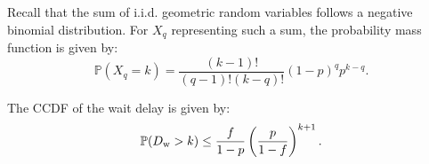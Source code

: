 Recall that the sum of i.i.d. geometric random variables follows a negative binomial distribution\cite{johnson2005univariate}. 
For $X_{q}$ representing such a sum, the probability mass function is given by:
\begin{equation}
    \mathbb{P}(X_{q}=k)=\dfrac{(k-1)!}{(q-1)!(k-q)!}(1-p)^qp^{k-q}.\label{eq:secARQ_geoSum}
\end{equation}
\begin{lemma}\label{lemma_arq_wait}
    The CCDF of the wait delay is given by:
    \begin{equation}
  \mathbb{P}(D_{\mathrm{w}} >k) \leq\frac{f}{1-p}\left(\frac{p}{1-f}\right)^{k+1}.\label{eq:secARQ_waitdelay} 
    \end{equation}
\end{lemma}
